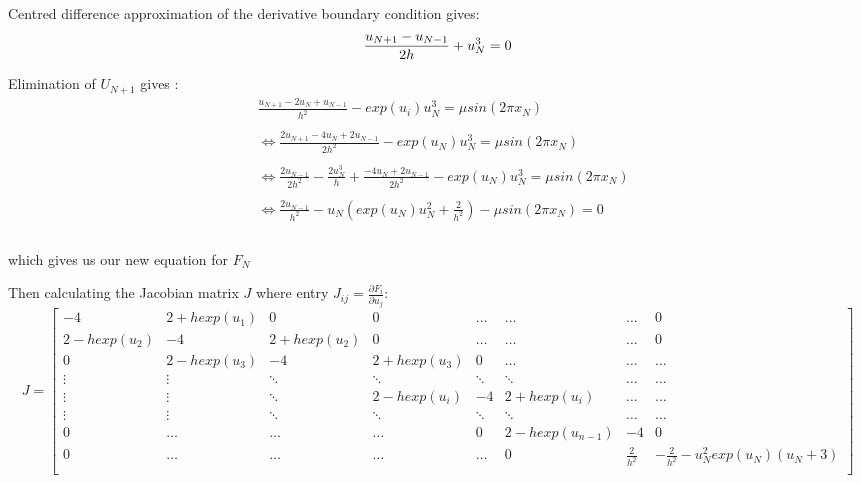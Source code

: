 \documentclass[fleqn]{report}
\begin{document}
Centred difference approximation of the derivative boundary condition gives:
\begin{equation}
\frac{u_{N+1} - u_{N-1}}{2h} + u^3_N = 0\\\\
\end{equation}

Elimination of $U_{N+1}$ gives :
\begin{equation}
\begin{split}
&\frac{u_{N+1} - 2u_N + u_{N-1}}{h^2} - exp(u_i)u^3_N = \mu sin(2 \pi x_N)\\\\
&\iff \frac{2u_{N+1} - 4u_N + 2u_{N-1}}{2h^2} - exp(u_N)u^3_N = \mu sin(2 \pi x_N)\\\\
&\iff \frac{2u_{N-1}}{2h^2} - \frac{2u^3_N}{h} + \frac{- 4u_N + 2u_{N-1}}{2h^2} - exp(u_N)u^3_N = \mu sin(2 \pi x_N)\\\\
&\iff \frac{2u_{N-1}}{h^2} - u_{N}(exp(u_N)u^2_N + \frac{2}{h^2}) - \mu sin(2 \pi x_N) = 0\\\\
\end{split}
\end{equation}

which gives us our new equation for $F_N$

Then calculating the Jacobian matrix $J$ where entry $J_{ij} = \frac{\partial F_i}{\partial u_j}$:
\[
 J=
\left[ {\begin{array}{cccccccc}
-4 & 2 +hexp(u_1) & 0 & 0 & \hdots & \hdots & \hdots & 0 \\
2 - hexp(u_2) & -4 & 2 + hexp(u_2) & 0 & \hdots & \hdots & \hdots & 0 \\ 
0 & 2 - hexp(u_3) & -4 & 2 + hexp(u_3) & 0 & \hdots & \hdots & \hdots \\
\vdots & \vdots & \ddots & \ddots & \ddots & \ddots & \hdots & \hdots\\
\vdots & \vdots & \ddots & 2 - hexp(u_i) & -4  & 2 + hexp(u_i) & \hdots & \hdots \\
\vdots & \vdots & \ddots & \ddots & \ddots & \ddots & \hdots & \hdots \\
0 & \hdots & \hdots & \hdots & 0 & 2 - hexp(u_{n-1}) & -4 & 0 \\
0 & \hdots & \hdots & \hdots & \hdots & 0 & \frac{2}{h^2} & - \frac{2}{h^2} - u_N^2exp(u_N)(u_N + 3) \\
  \end{array} } \right]
\]
\end{document}
